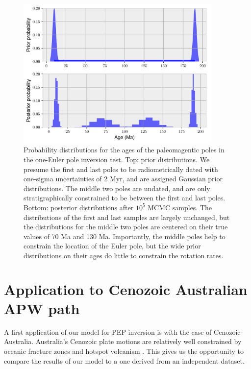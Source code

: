 \documentclass[preprint,12pt,authoryear]{elsarticle}
\begin{document}
\begin{figure}
\includegraphics[width=0.9\textwidth]{figures/synthetic/age_uncertainty_samples.pdf}
\caption[Probability distributions for ages of the paleomagnetic poles in the one-Euler pole inversion test.]{Probability distributions for the ages of the paleomagentic poles in the one-Euler pole inversion test. Top: prior distributions. We presume the first and last poles to be radiometrically dated with one-sigma uncertainties of 2 Myr, and are assigned Gaussian prior distributions. The middle two poles are undated, and are only stratigraphically constrained to be between the first and last poles. Bottom: posterior distributions after $10^5$ MCMC samples. The distributions of the first and last samples are largely unchanged, but the distributions for the middle two poles are centered on their true values of 70 Ma and 130 Ma. Importantly, the middle poles help to constrain the location of the Euler pole, but the wide prior distributions on their ages do little to constrain the rotation rates.}
\label{fig:age_uncertainty_samples}
\end{figure}

\section{Application to Cenozoic Australian APW path}
\label{sec:australia}
A first application of our model for PEP inversion is with the case of Cenozoic Australia.
Australia's Cenozoic plate motions are relatively well constrained by oceanic fracture zones
and hotspot volcanism \citep{muller1993revised, seton2012global}.
This gives us the opportunity to compare the results of our model to a one derived from an independent dataset.
\end{document}
